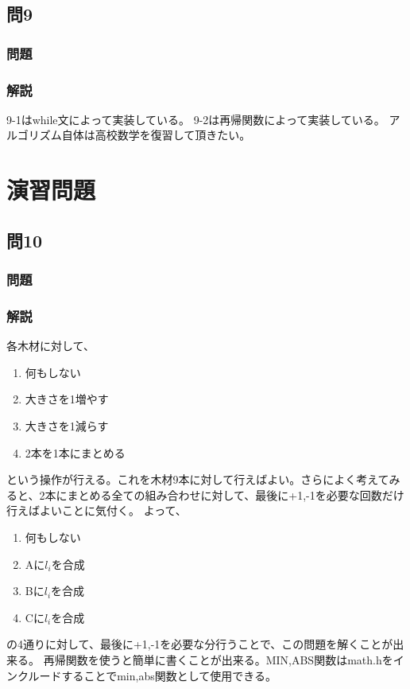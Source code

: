 \subsection{問9}
\subsubsection{問題}


\subsubsection{解説}

9-1はwhile文によって実装している。
9-2は再帰関数によって実装している。
アルゴリズム自体は高校数学を復習して頂きたい。

\section{演習問題}
\subsection{問10}
\subsubsection{問題}

\subsubsection{解説}

各木材に対して、
\begin{enumerate}
\item 何もしない
\item 大きさを1増やす
\item 大きさを1減らす
\item 2本を1本にまとめる
\end{enumerate}
という操作が行える。これを木材9本に対して行えばよい。さらによく考えてみると、2本にまとめる全ての組み合わせに対して、最後に+1,-1を必要な回数だけ行えばよいことに気付く。
よって、
\begin{enumerate}
\item 何もしない
\item Aに$l_i$を合成
\item Bに$l_i$を合成
\item Cに$l_i$を合成

\end{enumerate}
の4通りに対して、最後に+1,-1を必要な分行うことで、この問題を解くことが出来る。
再帰関数を使うと簡単に書くことが出来る。MIN,ABS関数はmath.hをインクルードすることでmin,abs関数として使用できる。

